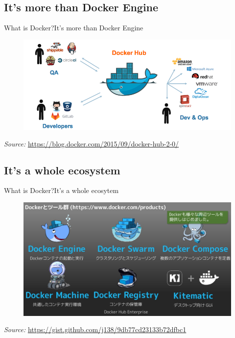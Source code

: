 \documentclass[10pt]{beamer}
\begin{document}
\subsection{It's more than Docker Engine}
\begin{frame}{What is Docker?}{It's more than Docker Engine}
	\begin{figure}[h!]
		\centering
		\includegraphics[width=1.\textwidth]{images/docker-hub-diagram.png}
	\end{figure}
	
	\vspace{1.2cm}
	\scriptsize{\textit{Source:} \url{https://blog.docker.com/2015/09/docker-hub-2-0/}}
\end{frame}
\subsection{It's a whole ecosystem}
\begin{frame}{What is Docker?}{It's a whole ecosytem}
	\begin{figure}[h!]
		\centering
		\includegraphics[width=1.\textwidth]{images/docker-ecosystem.png}
	\end{figure}
	
	\vspace{0.1cm}
	\scriptsize{\textit{Source:} \url{https://gist.github.com/j138/9db77cd23133b72dfbc1}}
\end{frame}
\end{document}
